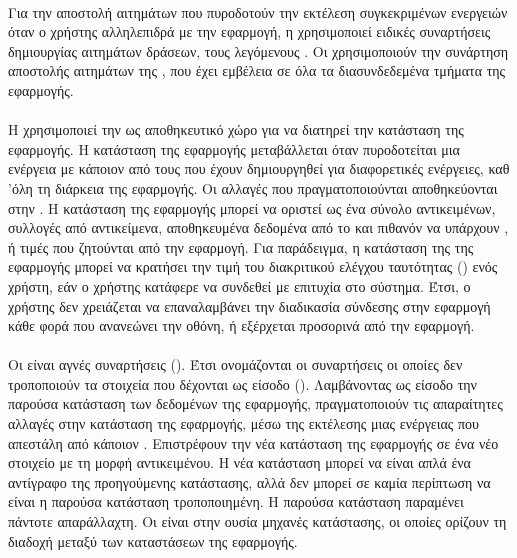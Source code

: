  \paragraph{}
 Για την αποστολή αιτημάτων που πυροδοτούν την εκτέλεση συγκεκριμένων ενεργειών όταν ο χρήστης αλληλεπιδρά με την εφαρμογή, η  χρησιμοποιεί ειδικές συναρτήσεις δημιουργίας αιτημάτων δράσεων, τους λεγόμενους . Οι  χρησιμοποιούν την συνάρτηση αποστολής αιτημάτων  της , που έχει εμβέλεια σε όλα τα διασυνδεδεμένα τμήματα της εφαρμογής.
 
 \paragraph{}
 \paragraph{}
 H  χρησιμοποιεί την  ως αποθηκευτικό χώρο για να διατηρεί την κατάσταση της εφαρμογής.  Η κατάσταση της εφαρμογής μεταβάλλεται όταν πυροδοτείται μια ενέργεια με κάποιον από τους  που έχουν δημιουργηθεί για διαφορετικές ενέργειες, καθ 'όλη τη διάρκεια της εφαρμογής. Οι αλλαγές που πραγματοποιούνται αποθηκεύονται στην . Η κατάσταση της εφαρμογής μπορεί να οριστεί ως ένα σύνολο αντικειμένων, συλλογές από αντικείμενα, αποθηκευμένα δεδομένα από το  και πιθανόν να υπάρχουν ,  ή  τιμές που ζητούνται από την εφαρμογή. Για παράδειγμα, η κατάσταση της  της εφαρμογής μπορεί να κρατήσει την τιμή του διακριτικού ελέγχου ταυτότητας () ενός χρήστη, εάν ο χρήστης κατάφερε να συνδεθεί με επιτυχία στο σύστημα. Έτσι, ο χρήστης δεν χρειάζεται να επαναλαμβάνει την διαδικασία σύνδεσης στην εφαρμογή κάθε φορά που ανανεώνει την οθόνη, ή εξέρχεται προσορινά από την εφαρμογή.

 \paragraph{}
 \paragraph{}
Οι  είναι αγνές συναρτήσεις (). Έτσι ονομάζονται οι συναρτήσεις οι οποίες δεν τροποποιούν τα στοιχεία που δέχονται ως είσοδο (). Λαμβάνοντας ως είσοδο την παρούσα κατάσταση των δεδομένων της εφαρμογής, πραγματοποιούν τις απαραίτητες αλλαγές στην κατάσταση της εφαρμογής, μέσω της εκτέλεσης μιας ενέργειας που απεστάλη από κάποιον . Επιστρέφουν την νέα κατάσταση της εφαρμογής σε ένα νέο στοιχείο με τη μορφή αντικειμένου. Η νέα κατάσταση μπορεί να είναι απλά ένα αντίγραφο της προηγούμενης κατάστασης, αλλά δεν μπορεί σε καμία περίπτωση να είναι η παρούσα κατάσταση τροποποιημένη. Η παρούσα κατάσταση παραμένει πάντοτε απαράλλαχτη. Οι  είναι στην ουσία μηχανές κατάστασης, οι οποίες ορίζουν τη διαδοχή μεταξύ των καταστάσεων της εφαρμογής.



